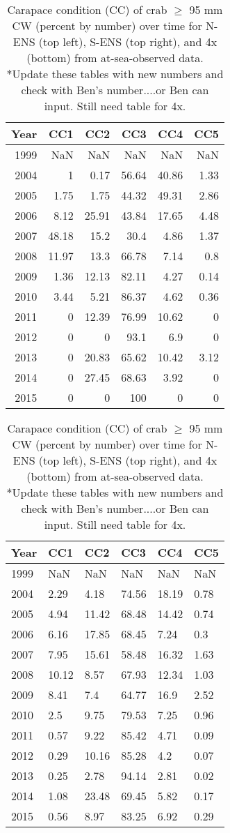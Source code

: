 \documentclass[paper=a4, fontsize=11pt]{article}
\begin{document}
\begin{table}[h]
\centering
\caption{Carapace condition (CC) of crab $\geq$ 95 mm CW (percent by number) over time for N-ENS (top left), S-ENS (top right), and 4x (bottom) from at-sea-observed data. *Update these tables with new numbers and check with Ben's number....or Ben can input. Still need table for 4x.}
\begin{tabular}{rrrrrr}
  \hline
Year & CC1 & CC2 & CC3 & CC4 & CC5 \\ 
  \hline
1999 & NaN & NaN & NaN & NaN & NaN \\ 
  2004 & 1 & 0.17 & 56.64 & 40.86 & 1.33 \\ 
  2005 & 1.75 & 1.75 & 44.32 & 49.31 & 2.86 \\ 
  2006 & 8.12 & 25.91 & 43.84 & 17.65 & 4.48 \\ 
  2007 & 48.18 & 15.2 & 30.4 & 4.86 & 1.37 \\ 
  2008 & 11.97 & 13.3 & 66.78 & 7.14 & 0.8 \\ 
  2009 & 1.36 & 12.13 & 82.11 & 4.27 & 0.14 \\ 
  2010 & 3.44 & 5.21 & 86.37 & 4.62 & 0.36 \\ 
  2011 & 0 & 12.39 & 76.99 & 10.62 & 0 \\ 
  2012 & 0 & 0 & 93.1 & 6.9 & 0 \\ 
  2013 & 0 & 20.83 & 65.62 & 10.42 & 3.12 \\ 
  2014 & 0 & 27.45 & 68.63 & 3.92 & 0 \\ 
  2015 & 0 & 0 & 100 & 0 & 0 \\ 
   \hline
\end{tabular}
\qquad
\begin{tabular}{llllll}
  \hline
 Year & CC1 & CC2 & CC3 & CC4 & CC5 \\ 
  \hline
1999 & NaN & NaN & NaN & NaN & NaN \\ 
  2004 & 2.29 & 4.18 & 74.56 & 18.19 & 0.78 \\ 
  2005 & 4.94 & 11.42 & 68.48 & 14.42 & 0.74 \\ 
  2006 & 6.16 & 17.85 & 68.45 & 7.24 & 0.3 \\ 
  2007 & 7.95 & 15.61 & 58.48 & 16.32 & 1.63 \\ 
  2008 & 10.12 & 8.57 & 67.93 & 12.34 & 1.03 \\ 
  2009 & 8.41 & 7.4 & 64.77 & 16.9 & 2.52 \\ 
  2010 & 2.5 & 9.75 & 79.53 & 7.25 & 0.96 \\ 
  2011 & 0.57 & 9.22 & 85.42 & 4.71 & 0.09 \\ 
  2012 & 0.29 & 10.16 & 85.28 & 4.2 & 0.07 \\ 
  2013 & 0.25 & 2.78 & 94.14 & 2.81 & 0.02 \\ 
  2014 & 1.08 & 23.48 & 69.45 & 5.82 & 0.17 \\ 
  2015 & 0.56 & 8.97 & 83.25 & 6.92 & 0.29 \\ 
   \hline
\end{tabular}
\end{table}
\end{document}
